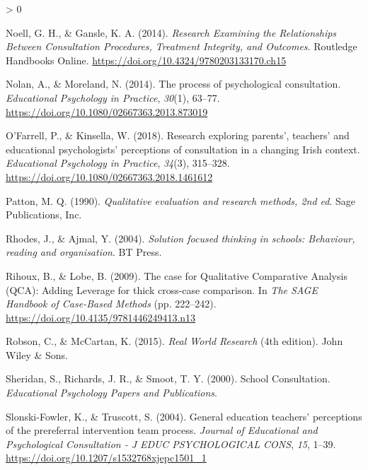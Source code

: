 \documentclass[
  english,
  man,floatsintext]{apa6}
\newlength{\cslhangindent}
\newenvironment{CSLReferences}[2] %
 {%
  \setlength{\parindent}{0pt}
  \ifodd #1 \everypar{\setlength{\hangindent}{\cslhangindent}}\ignorespaces\fi
  \ifnum #2 > 0
  \setlength{\parskip}{#2\baselineskip}
  \fi
 }%
 {}
\begin{document}
\begin{CSLReferences}{1}{0}
\leavevmode\hypertarget{ref-noellResearchExaminingRelationships2014}{}%
Noell, G. H., \& Gansle, K. A. (2014). \emph{Research Examining the Relationships Between Consultation Procedures, Treatment Integrity, and Outcomes}. Routledge Handbooks Online. \url{https://doi.org/10.4324/9780203133170.ch15}

\leavevmode\hypertarget{ref-nolanProcessPsychologicalConsultation2014}{}%
Nolan, A., \& Moreland, N. (2014). The process of psychological consultation. \emph{Educational Psychology in Practice}, \emph{30}(1), 63--77. \url{https://doi.org/10.1080/02667363.2013.873019}

\leavevmode\hypertarget{ref-ofarrellResearchExploringParents2018}{}%
O'Farrell, P., \& Kinsella, W. (2018). Research exploring parents', teachers' and educational psychologists' perceptions of consultation in a changing {Irish} context. \emph{Educational Psychology in Practice}, \emph{34}(3), 315--328. \url{https://doi.org/10.1080/02667363.2018.1461612}

\leavevmode\hypertarget{ref-pattonQualitativeEvaluationResearch1990}{}%
Patton, M. Q. (1990). \emph{Qualitative evaluation and research methods, 2nd ed}. {Sage Publications, Inc}.

\leavevmode\hypertarget{ref-rhodesSolutionFocusedThinking2004a}{}%
Rhodes, J., \& Ajmal, Y. (2004). \emph{Solution focused thinking in schools: Behaviour, reading and organisation}. {BT Press}.

\leavevmode\hypertarget{ref-rihouxCaseQualitativeComparative2009}{}%
Rihoux, B., \& Lobe, B. (2009). The case for {Qualitative Comparative Analysis} ({QCA}): {Adding Leverage} for thick cross-case comparison. In \emph{The {SAGE Handbook} of {Case}-{Based Methods}} (pp. 222--242). \url{https://doi.org/10.4135/9781446249413.n13}

\leavevmode\hypertarget{ref-robsonRealWorldResearch2015}{}%
Robson, C., \& McCartan, K. (2015). \emph{Real {World Research}} (4th edition). {John Wiley \& Sons}.

\leavevmode\hypertarget{ref-sheridanSchoolConsultation2000}{}%
Sheridan, S., Richards, J. R., \& Smoot, T. Y. (2000). School {Consultation}. \emph{Educational Psychology Papers and Publications}.

\leavevmode\hypertarget{ref-slonski-fowlerGeneralEducationTeachers2004}{}%
Slonski-Fowler, K., \& Truscott, S. (2004). General education teachers' perceptions of the prereferral intervention team process. \emph{Journal of Educational and Psychological Consultation - J EDUC PSYCHOLOGICAL CONS}, \emph{15}, 1--39. \url{https://doi.org/10.1207/s1532768xjepc1501_1}


\end{CSLReferences}
\end{document}
